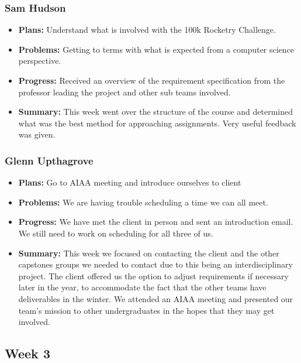 \documentclass[onecolumn, draftclsnofoot,10pt, compsoc]{IEEEtran}
\begin{document}
\subsubsection{Sam Hudson}
\begin {itemize}
\item \textbf{Plans: }Understand what is involved with the 100k Rocketry Challenge.
\item \textbf{Problems: }Getting to terms with what is expected from a computer science perspective. 
\item \textbf{Progress: }Received an overview of the requirement specification from the professor leading the project and other sub teams involved.
\item \textbf{Summary: }This week went over the structure of the course and determined what was the best method for approaching assignments. Very useful feedback was given.
\end {itemize}
\subsubsection{Glenn Upthagrove}
\begin {itemize}
 \item \textbf{Plans: }Go to AIAA meeting and introduce ourselves to client
 \item \textbf{Problems: }We are having trouble scheduling a time we can all meet.
 \item \textbf{Progress: }We have met the client in person and sent an introduction email. We still need to work on scheduling for all three of us. 
 \item \textbf{Summary: }This week we focused on contacting the client and the other capstones groups we needed to contact due to this being an interdisciplinary project. The client offered us the option to adjust requirements if necessary later in the year, to accommodate the fact that the other teams have deliverables in the winter. We attended an AIAA meeting and presented our team's mission to other undergraduates in the hopes that they may get involved. 
\end {itemize}
\subsection {Week 3}
\end{document}
